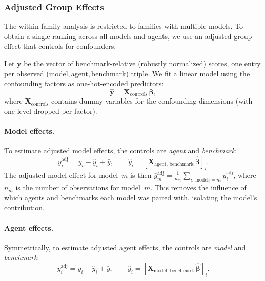 \subsubsection{Adjusted Group Effects}
\label{app:adjusted-effects}

The within-family analysis is restricted to families with multiple models.  To
obtain a single ranking across all \NumModels{} models and \NumAgents{} agents,
we use an adjusted group effect that controls for confounders.

Let $\mathbf{y}$ be the vector of benchmark-relative (robustly normalized)
scores, one entry per observed (model,\,agent,\,benchmark) triple.  We fit a
linear model using the confounding factors as one-hot-encoded predictors:
\begin{equation}
  \hat{\mathbf{y}} = \mathbf{X}_{\text{controls}}\,\boldsymbol{\beta},
  \label{eq:confound-fit}
\end{equation}
where $\mathbf{X}_{\text{controls}}$ contains dummy variables for the
confounding dimensions (with one level dropped per factor).

\paragraph{Model effects.}
To estimate adjusted model effects, the controls are \emph{agent} and
\emph{benchmark}:
\begin{equation}
  y^{\mathrm{adj}}_i
  = y_i - \hat{y}_i + \bar{y},
  \qquad
  \hat{y}_i = [\mathbf{X}_{\text{agent, benchmark}}\,\hat{\boldsymbol{\beta}}]_i.
  \label{eq:adjusted-model}
\end{equation}
The adjusted model effect for model~$m$ is then
$\bar{y}^{\mathrm{adj}}_m = \frac{1}{n_m}\sum_{i:\,\text{model}_i = m}
y^{\mathrm{adj}}_i$, where $n_m$ is the number of observations for model~$m$.
This removes the influence of which agents and benchmarks each model was paired
with, isolating the model's contribution.

\paragraph{Agent effects.}
Symmetrically, to estimate adjusted agent effects, the controls are
\emph{model} and \emph{benchmark}:
\begin{equation}
  y^{\mathrm{adj}}_i
  = y_i - \hat{y}_i + \bar{y},
  \qquad
  \hat{y}_i = [\mathbf{X}_{\text{model, benchmark}}\,\hat{\boldsymbol{\beta}}]_i.
  \label{eq:adjusted-agent}
\end{equation}

